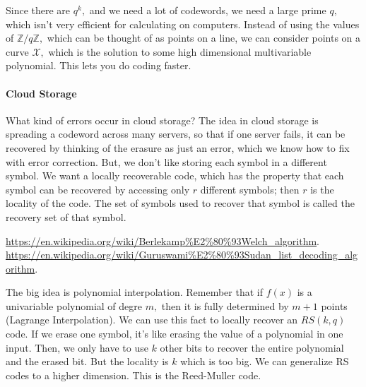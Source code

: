 \documentclass[12pt]{article}
\begin{document}
Since there are $q^k,$ and we need a lot of codewords, we need a large prime $q,$ which isn't very efficient for calculating on computers. Instead of using the values of $\mathbb{Z}/q\mathbb{Z},$ which can be thought of as points on a line, we can consider points on a curve $\mathcal{X},$ which is the solution to some high dimensional multivariable polynomial. This lets you do coding faster.

\paragraph{Cloud Storage}
What kind of errors occur in cloud storage? The idea in cloud storage is spreading a codeword across many servers, so that if one server fails, it can be recovered by thinking of the erasure as just an error, which we know how to fix with error correction. But, we don't like storing each symbol in a different symbol. We want a locally recoverable code, which has the property that each symbol can be recovered by accessing only $r$ different symbols; then $r$ is the locality of the code. The set of symbols used to recover that symbol is called the recovery set of that symbol.

\url{https://en.wikipedia.org/wiki/Berlekamp%E2%80%93Welch_algorithm}.
\url{https://en.wikipedia.org/wiki/Guruswami%E2%80%93Sudan_list_decoding_algorithm}.

The big idea is polynomial interpolation. Remember that if $f(x)$ is a univariable polynomial of degre $m,$ then it is fully determined by $m+1$ points (Lagrange Interpolation). We can use this fact to locally recover an $RS(k,q)$ code. If we erase one symbol, it's like erasing the value of a polynomial in one input. Then, we only have to use $k$ other bits to recover the entire polynomial and the erased bit. But the locality is $k$ which is too big. We can generalize RS codes to a higher dimension. This is the Reed-Muller code.
\end{document}
